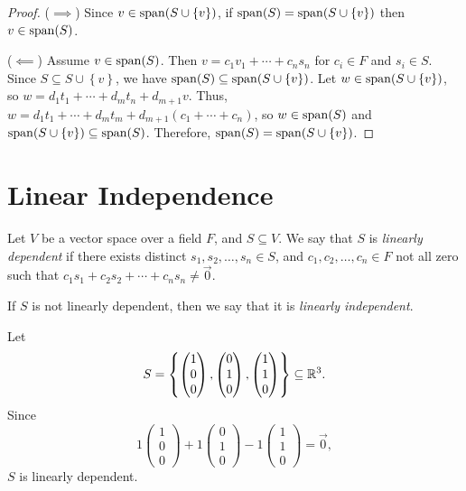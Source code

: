 \begin{proof}\proofbreak
    ($\implies$) Since $v \in \operatorname{span}(S \cup \left\{v\right\})$, if $\operatorname{span}(S) = \operatorname{span}(S \cup \left\{v\right\})$ then $v \in \operatorname{span}(S)$.

    ($\impliedby$) Assume $v \in \operatorname{span}(S)$. Then $v = c_1v_1 + \cdots + c_ns_n$ for $c_i \in F$ and $s_i \in S$. Since $S \subseteq S \cup \left\{v\right\}$, we have $\operatorname{span}(S) \subseteq \operatorname{span}(S \cup \left\{v\right\})$. Let $w \in \operatorname{span}(S \cup \left\{v\right\})$, so $w = d_1t_1 + \cdots + d_mt_n + d_{m+1}v$. Thus, $w = d_1t_1 + \cdots + d_mt_m + d_{m+1}(c_1 + \cdots + c_n)$, so $w \in \operatorname{span}(S)$ and $\operatorname{span}(S \cup \left\{v\right\}) \subseteq \operatorname{span}(S)$. Therefore, $\operatorname{span}(S) = \operatorname{span}(S \cup \left\{v\right\})$.
\end{proof}

\section{Linear Independence}

\begin{defn}
    Let $V$ be a vector space over a field $F$, and $S \subseteq V$. We say that $S$ is \emph{linearly dependent} if there exists distinct $s_1, s_2, \ldots, s_n \in S$, and $c_1, c_2, \ldots, c_n \in F$ not all zero such that $c_1s_1 + c_2s_2 + \cdots + c_ns_n \neq \vec{0}$.
\end{defn}

\begin{rmk}
    If $S$ is not linearly dependent, then we say that it is \emph{linearly independent}.
\end{rmk}

\begin{exmp}
    Let \[S = \left\{\begin{pmatrix}1 \\ 0 \\ 0\end{pmatrix}, \begin{pmatrix}0 \\ 1 \\ 0\end{pmatrix}, \begin{pmatrix}1 \\ 1 \\ 0\end{pmatrix} \right\} \subseteq \mathbb{R}^3.\] Since \[1\begin{pmatrix}1 \\ 0 \\ 0\end{pmatrix} + 1\begin{pmatrix}0 \\ 1 \\ 0\end{pmatrix} - 1\begin{pmatrix}1 \\ 1 \\ 0\end{pmatrix} = \vec{0},\] $S$ is linearly dependent.
\end{exmp}

